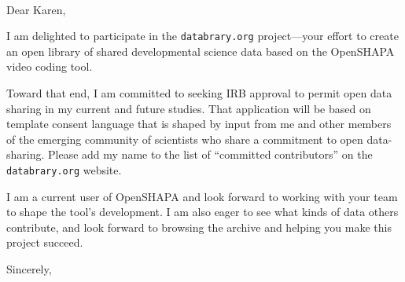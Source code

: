 \documentclass{letter}
\begin{document}
\begin{letter}{~~}

\opening{Dear Karen,}

I am delighted to participate in the \texttt{databrary.org} project---your effort to create an open library of shared developmental science data based on the OpenSHAPA video coding tool. 

Toward that end, I am committed to seeking IRB approval to permit open data sharing in my current and future studies. That application will be based on template consent language that is shaped by input from me and other members of the emerging community of scientists who share a commitment to open data-sharing. Please add my name to the list of ``committed contributors'' on the \texttt{databrary.org} website.

I am a current user of OpenSHAPA and look forward to working with your team to shape the tool's development. I am also eager to see what kinds of data others contribute, and look forward to browsing the archive and helping you make this project succeed.

\closing{Sincerely,}

\end{letter}
\end{document}
